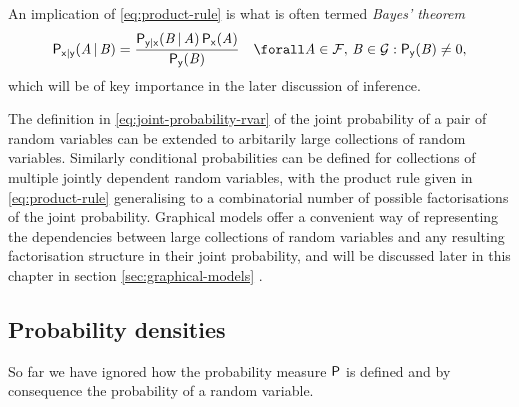 An implication of \eqref{eq:product-rule} is what is often termed \emph{Bayes' theorem}
\begin{equation}\label{eq:bayes-theorem}
\begin{split}
  \prob{\rvar{x}|\rvar{y}}(\set{A} \gvn \set{B}) =
  \frac
    {\prob{\rvar{y}|\rvar{x}}(\set{B} \gvn \set{A}) \, \prob{\rvar{x}}(\set{A})}
    {\prob{\rvar{y}}(\set{B})} 
  \quad
  \forall \set{A} \in \sset{F},\,
  \set{B} \in \sset{G} : \prob{\rvar{y}}(\set{B}) \neq 0,
\end{split}
\end{equation}
which will be of key importance in the later discussion of inference.

The definition in \eqref{eq:joint-probability-rvar} of the joint probability of a pair of random variables can be extended to arbitarily large collections of random variables. Similarly conditional probabilities can be defined for collections of multiple jointly dependent random variables, with the product rule given in \eqref{eq:product-rule} generalising to a combinatorial number of possible factorisations of the joint probability. Graphical models offer a convenient way of representing the dependencies between large collections of random variables and any resulting factorisation structure in their joint probability, and will be discussed later in this chapter in section \ref{sec:graphical-models} .

\subsection{Probability densities}\label{subsec:probability-densities}

So far we have ignored how the probability measure $\mathsf{P}$ is defined and by consequence the probability of a random variable. 

